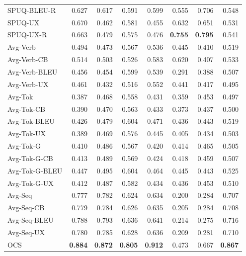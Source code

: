 {\begin{table}[t]
\begin{tabular}{@{}lrrrrrrr@{}}
SPUQ-BLEU-R & 0.627 & 0.617 & 0.591 & 0.599 & 0.555 & 0.706 & 0.548 \\
SPUQ-UX & 0.670 & 0.462 & 0.581 & 0.455 & 0.632 & 0.651 & 0.531 \\
SPUQ-UX-R & 0.663 & 0.479 & 0.575 & 0.476 & \textbf{0.755} & \textbf{0.795} & 0.541 \\
\addlinespace
Avg-Verb & 0.494 & 0.473 & 0.567 & 0.536 & 0.445 & 0.410 & 0.519 \\
Avg-Verb-CB & 0.514 & 0.503 & 0.526 & 0.583 & 0.620 & 0.407 & 0.533 \\
Avg-Verb-BLEU & 0.456 & 0.454 & 0.599 & 0.539 & 0.291 & 0.388 & 0.507 \\
Avg-Verb-UX & 0.461 & 0.432 & 0.516 & 0.552 & 0.441 & 0.417 & 0.495 \\
\addlinespace
Avg-Tok & 0.387 & 0.468 & 0.558 & 0.431 & 0.359 & 0.453 & 0.497 \\
Avg-Tok-CB & 0.390 & 0.470 & 0.563 & 0.433 & 0.373 & 0.437 & 0.500 \\
Avg-Tok-BLEU & 0.426 & 0.479 & 0.604 & 0.471 & 0.436 & 0.443 & 0.519 \\
Avg-Tok-UX & 0.389 & 0.469 & 0.576 & 0.445 & 0.405 & 0.434 & 0.503 \\
Avg-Tok-G & 0.410 & 0.486 & 0.567 & 0.420 & 0.414 & 0.465 & 0.505 \\
Avg-Tok-G-CB & 0.413 & 0.489 & 0.569 & 0.424 & 0.418 & 0.459 & 0.507 \\
Avg-Tok-G-BLEU & 0.447 & 0.495 & 0.604 & 0.464 & 0.445 & 0.443 & 0.525 \\
Avg-Tok-G-UX & 0.412 & 0.487 & 0.582 & 0.434 & 0.436 & 0.453 & 0.510 \\
\addlinespace
Avg-Seq & 0.777 & 0.782 & 0.624 & 0.634 & 0.200 & 0.284 & 0.707 \\
Avg-Seq-CB & 0.779 & 0.784 & 0.626 & 0.635 & 0.205 & 0.284 & 0.708 \\
Avg-Seq-BLEU & 0.788 & 0.793 & 0.636 & 0.641 & 0.214 & 0.275 & 0.716 \\
Avg-Seq-UX & 0.780 & 0.785 & 0.628 & 0.636 & 0.209 & 0.281 & 0.710 \\
\addlinespace
OCS & \textbf{0.884} & \textbf{0.872} & \textbf{0.805} & \textbf{0.912} & 0.473 & 0.667 & \textbf{0.867} \\
\bottomrule
\end{tabular}
\end{table}
}
